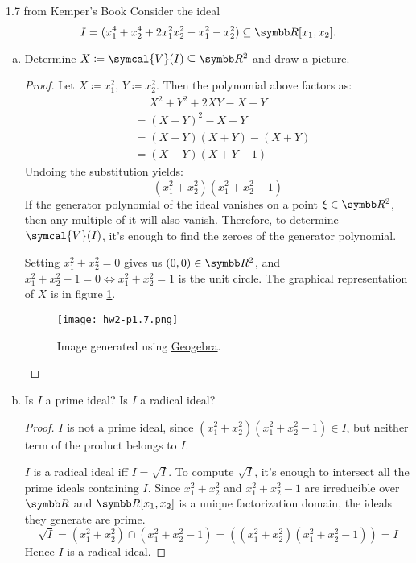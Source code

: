 \begin{problem*}{1.7 from Kemper's Book}
Consider the ideal
\[
    I = (x_1^4 + x_2^4 + 2 x_1^2 x_2^2 - x_1^2 - x_2^2) \subseteq \reals[x_1, x_2].
\]
\begin{enumerate}[(a)]
    \item Determine \(X \coloneqq \symcal{V}(I) \subseteq \reals^2\) and draw a picture.
    \begin{proof}
    Let \(X \coloneqq x_1^2\), \(Y \coloneqq x_2^2\). Then the polynomial above factors as:
    \begin{align*}
        &\phantom{=} X^2 + Y^2 + 2 X Y - X - Y \\
        &= (X + Y)^2 - X - Y \\
        &= (X + Y)(X + Y) - (X + Y) \\
        &= (X + Y)(X + Y - 1)
    \end{align*}
    Undoing the substitution yields:
    \[
        (x_1^2 + x_2^2) (x_1^2 + x_2^2 - 1)
    \]
    If the generator polynomial of the ideal vanishes on a point \(\xi \in \reals^2\), then any multiple of it will also vanish. Therefore, to determine \(\symcal{V}(I)\), it's enough to find the zeroes of the generator polynomial.

    Setting \(x_1^2 + x_2^2 = 0\) gives us \((0, 0) \in \reals^2\), and \(x_1^2 + x_2^2 - 1 = 0 \iff x_1^2 + x_2^2 = 1\) is the unit circle. The graphical representation of \(X\) is in figure \ref{problem1.7}.
    
    \begin{figure}[htbp]
        \centering
        \texttt{[image: hw2-p1.7.png]}
        \caption{Image generated using \href{https://www.geogebra.org/calculator}{Geogebra}.}
        \label{problem1.7}
    \end{figure}
    \end{proof}
    
    \item Is \(I\) a prime ideal? Is \(I\) a radical ideal?
    \begin{proof}
    \(I\) is not a prime ideal, since \((x_1^2 + x_2^2)(x_1^2 + x_2^2 - 1) \in I\), but neither term of the product belongs to \(I\).
    
    \(I\) is a radical ideal iff \(I = \sqrt{I}\). To compute \(\sqrt{I}\), it's enough to intersect all the prime ideals containing \(I\). Since \(x_1^2 + x_2^2\) and \(x_1^2 + x_2^2 - 1\) are irreducible over \(\reals\) and \(\reals[x_1, x_2]\) is a unique factorization domain, the ideals they generate are prime.
    \[
        \sqrt{I} = (x_1^2 + x_2^2) \cap (x_1^2 + x_2^2 - 1) = ((x_1^2 + x_2^2)(x_1^2 + x_2^2 - 1)) = I
    \]
    Hence \(I\) is a radical ideal.
    \end{proof}
    

\end{enumerate}
\end{problem*}
